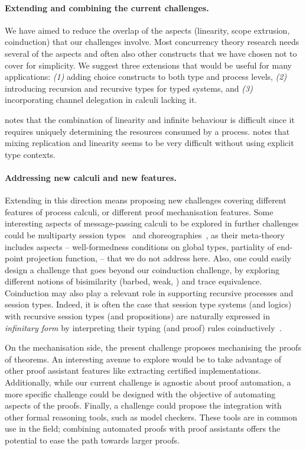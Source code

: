 \documentclass[runningheads]{llncs}
\begin{document}
\paragraph{Extending and combining the current challenges.}
We have aimed to reduce the overlap of the aspects (linearity, scope extrusion, coinduction) that our challenges involve.
Most concurrency theory research needs several of the aspects and often also other constructs that we have chosen not to cover for simplicity.
We suggest three extensions that would be useful for many applications:
\emph{(1)} adding choice constructs to both type and process levels,
\emph{(2)} introducing recursion and recursive types for typed systems, and
\emph{(3)} incorporating channel delegation in calculi lacking it.

\cite{DBLP:conf/forte/ZalakainD21} notes that the combination of linearity and infinite behaviour is difficult since it requires uniquely determining the resources consumed by a process.
\cite{Zalakain2019} notes that mixing replication and linearity seems to be very difficult without using explicit type contexts.

\paragraph{Addressing new calculi and new features.}
Extending in this direction means proposing new challenges covering different features of process calculi, or different proof mechanisation features.
Some interesting aspects of message-passing calculi to be explored in further challenges could be multiparty session types~\cite{10.1145/2827695} and choreographies~\cite{Carbone2013}, as their meta-theory includes aspects -- \eg well-formedness conditions on global types, partiality of end-point projection function, \etc -- that we do not address here.
Also, one could easily design a challenge that goes beyond our coinduction challenge, by exploring different notions of bisimilarity (barbed, weak, \etc) and trace equivalence.
%
Coinduction may also play a relevant role in supporting recursive processes and
session types. Indeed, it is often the case that session type systems (and
logics) with recursive session types (and propositions) are naturally expressed
in \emph{infinitary form} by interpreting their typing (and proof) rules
coinductively~\cite{BaeldeDoumaneSaurin16,DerakhshanPfenning22,HornePadovani23}.

On the mechanisation side, the present challenge proposes mechanising the proofs of theorems.
An interesting avenue to explore would be to take advantage of other proof assistant features like extracting certified implementations.
Additionally, while our current challenge is agnostic about proof automation, a more specific challenge could be designed with the objective of automating aspects of the proofs.
Finally, a challenge could propose the integration with other formal reasoning tools, such as model checkers.
These tools are in common use in the field; combining automated proofs with proof assistants offers the potential to ease the path towards larger proofs.
\end{document}
